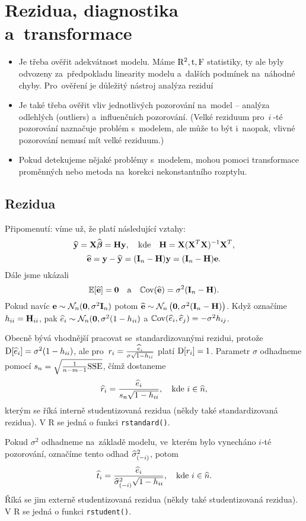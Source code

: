 \chapter{Rezidua, diagnostika a~transformace}
\begin{itemize}
 \item Je třeba ověřit adekvátnost modelu. Máme $\mathrm{R}^2, \mathrm{t}, \text{F}$ statistiky, ty ale byly odvozeny za~předpokladu linearity modelu a~dalších podmínek na~náhodné chyby. Pro~ověření je důležitý nástroj analýza reziduí
 \item Je také třeba ověřit vliv jednotlivých pozorování na~model -- analýza odlehlých (outliers) a~influenčních pozorování. (Velké reziduum pro~$i~$-té pozorování naznačuje problém s~modelem, ale může to být i~naopak, vlivné pozorování nemusí mít velké reziduum.)
 \item Pokud detekujeme nějaké problémy s~modelem, mohou pomoci transformace proměnných nebo metoda na~korekci nekonstantního rozptylu.
\end{itemize}
\section{Rezidua}
Připomenutí: víme už, že platí následující vztahy:
 $$
 \widehat{\mathbf{y}} = \mathbf{X} \widehat{\boldsymbol{\beta}} = \textbf{H} \mathbf{y}, \quad \text{kde} \quad \textbf{H} = \mathbf{X} (\mathbf{X}^T \mathbf{X})^{-1} \mathbf{X}^T,
 $$
 $$
 \widehat{\mathbf{e}} = \mathbf{y} - \widehat{\mathbf{y}} = (\textbf{I}_{n} - \textbf{H}) \mathbf{y} = (\textbf{I}_{n} - \textbf{H}) \mathbf{e}.
 $$
Dále jsme ukázali
 $$
\mathbb{E} [\widehat{\mathbf{e}}] = \boldsymbol{0} \quad \text{a} \quad \mathbb{C}\mathrm{ov}(\widehat{\mathbf{e}}) = \sigma^2 (\textbf{I}_{n} - \textbf{H}).
 $$
Pokud navíc
$\mathbf{e} \sim \mathcal{N}_n (\boldsymbol{0},\sigma^2 \textbf{I}_{n})$ potom $\widehat{\mathbf{e}} \sim \mathcal{N}_n \left(\boldsymbol{0},\sigma^2 (\textbf{I}_{n} - \textbf{H})\right)$. Když označíme $h_{ii} = \textbf{H}_{ii} $, pak $ \widehat{e}_i \sim \mathcal{N}_n (\boldsymbol{0}, \sigma^2 (1 - h_{ii}) $ a $ \mathbb{C}\mathrm{ov}(\widehat{e}_i, \widehat{e}_j) = -\sigma^2 h_{ij} $.

Obecně bývá vhodnější pracovat se~standardizovanými rezidui, protože $\mathrm{D} [\widehat{e}_i] = \sigma^2 (1 - h_{ii})$, ale pro~$r_i = \frac{\widehat{e}_i}{\sigma \sqrt{1-h_{ii}}}$ platí $\mathrm{D} [r_i] = 1$.
 Parametr $\sigma$ odhadneme pomocí $s_n = \sqrt{\frac{1}{n-m-1} \mathrm{SSE}}$, čímž dostaneme
 $$
  \widehat{r}_i = \frac{\widehat{e}_i}{s_n \sqrt{1 - h_{ii}}}, \quad \text{kde }  i\in\widehat{n},
 $$
kterým se říká interně studentizovaná rezidua (někdy také standardizovaná rezidua). V R se jedná o funkci \verb|rstandard()|.

Pokud $\sigma^2$ odhadneme na~základě modelu, ve~kterém bylo vynecháno $i$-té pozorování, označíme tento odhad $\widehat{\sigma}^2_{(-i)}$, potom
 $$
 \widehat{t}_i = \frac{\widehat{e}_i}{  \widehat{\sigma}^2_{(-i)} \sqrt{1 - h_{ii}}}, \quad \text{kde } i\in\widehat{n}.
 $$
 Říká se jim externě studentizovaná rezidua (někdy také studentizovaná rezidua). V R se jedná o funkci \verb|rstudent()|.
 

